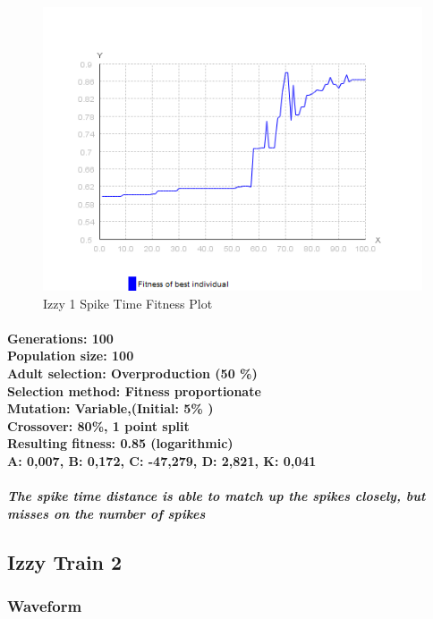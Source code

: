 \documentclass[titlepage,norsk]{article}
\begin{document}
\begin{figure}[h!]
\centering
\includegraphics[scale=0.75]{izzy1spikeFitness.png}
\caption{Izzy 1 Spike Time Fitness Plot}
\label{fig:awesome_image}
\end{figure}

\paragraph{
Generations: 100\\
Population size: 100\\
Adult selection: Overproduction (50 \%) \\
Selection method: Fitness proportionate\\
Mutation: Variable,(Initial:  5\% )\\
Crossover: 80\%, 1 point split \\
Resulting fitness: 0.85 (logarithmic) \\
A: 0,007, B: 0,172, C: -47,279, D: 2,821, K: 0,041  \\
}

\subparagraph{The spike time distance is able to match up the spikes closely, but misses on the number of spikes
}
\subsection{Izzy Train 2}

\subsubsection{Waveform}
\end{document}
